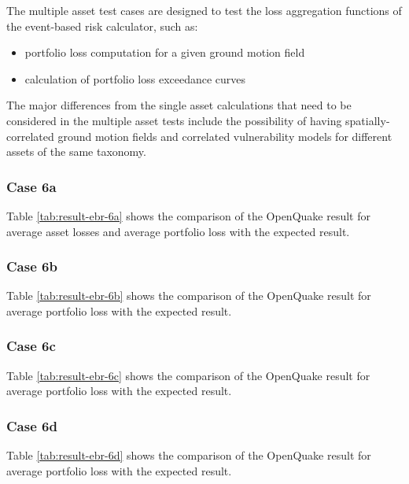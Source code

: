 The multiple asset test cases are designed to test the loss aggregation functions of the event-based risk calculator, such as:

\begin{itemize}
\item portfolio loss computation for a given ground motion field
\item calculation of portfolio loss exceedance curves
\end{itemize}

The major differences from the single asset calculations that need to be considered in the multiple asset tests include the possibility of having spatially-correlated ground motion fields and correlated vulnerability models for different assets of the same taxonomy.

\subsubsection{Case 6a}


Table \ref{tab:result-ebr-6a} shows the comparison of the OpenQuake result for average asset losses and average portfolio loss with the expected result.

\subsubsection{Case 6b}


Table \ref{tab:result-ebr-6b} shows the comparison of the OpenQuake result for average portfolio loss with the expected result.

\subsubsection{Case 6c}


Table \ref{tab:result-ebr-6c} shows the comparison of the OpenQuake result for average portfolio loss with the expected result.

\subsubsection{Case 6d}


Table \ref{tab:result-ebr-6d} shows the comparison of the OpenQuake result for average portfolio loss with the expected result.

